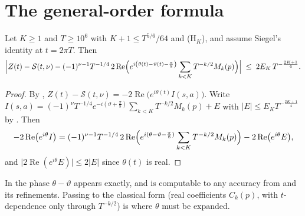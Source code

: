 \section{The general-order formula}
\label{sec:rsg_formula}

\begin{theorem}
\label{thm:rsg_formula}
Let $K\ge1$ and $T\ge10^{6}$ with $K+1\le T^{5/6}/64$ and (H$_{K}$), and assume Siegel's
identity  at $t=2\pi T$.  Then
\[
  \Bigl\lvert Z(t)-\mathcal{S}(t,\nu)
    -(-1)^{\nu-1}T^{-1/4}\,
      2\operatorname{Re}\Bigl(e^{i\left(\theta(t)-\vartheta(t)-\frac\pi8\right)}
        \sum_{k<K}T^{-k/2}M_{k}(p)\Bigr)\Bigr\rvert
  \;\le\;2E_{K}\,T^{-\frac{2K+1}4}.
\]
\end{theorem}

\begin{proof}
By ,
$Z(t)-\mathcal{S}(t,\nu)=-2\operatorname{Re}\bigl(e^{i\theta(t)}I(s,a)\bigr)$.  Write
$I(s,a)=(-1)^{\nu}T^{-1/4}e^{-i(\vartheta+\frac\pi8)}\sum_{k<K}T^{-k/2}M_{k}(p)+E$ with
$\lvert E\rvert\le E_{K}T^{-\frac{2K+1}4}$ by .  Then
\[
  -2\operatorname{Re}\bigl(e^{i\theta}I\bigr)
  =(-1)^{\nu-1}T^{-1/4}\,2\operatorname{Re}
     \Bigl(e^{i(\theta-\vartheta-\frac\pi8)}\sum_{k<K}T^{-k/2}M_{k}(p)\Bigr)
   -2\operatorname{Re}\bigl(e^{i\theta}E\bigr),
\]
and $\lvert2\operatorname{Re}(e^{i\theta}E)\rvert\le2\lvert E\rvert$ since $\theta(t)$ is real.
\end{proof}

In  the phase $\theta-\vartheta$ appears exactly, and is computable to
any accuracy from  and its refinements.  Passing to the classical form (real
coefficients $C_{k}(p)$, with $t$-dependence only through $T^{-k/2}$) is where $\theta$ must be
expanded.

